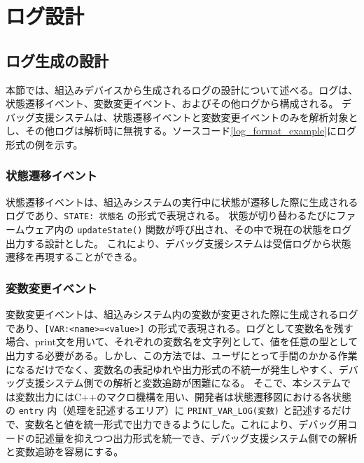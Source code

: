 \documentclass[12pt]{jreport}
\begin{document}
\section{ログ設計}
\label{sec:log_design}

\subsection{ログ生成の設計}
\begin{par}
本節では、組込みデバイスから生成されるログの設計について述べる。ログは、状態遷移イベント、変数変更イベント、およびその他ログから構成される。
デバッグ支援システムは、状態遷移イベントと変数変更イベントのみを解析対象とし、その他ログは解析時に無視する。ソースコード\ref{log_format_example}にログ形式の例を示す。
\end{par}

\subsubsection{状態遷移イベント}
\begin{par}
状態遷移イベントは、組込みシステムの実行中に状態が遷移した際に生成されるログであり、\verb|STATE: 状態名| の形式で表現される。
状態が切り替わるたびにファームウェア内の \verb|updateState()| 関数が呼び出され、その中で現在の状態をログ出力する設計とした。
これにより、デバッグ支援システムは受信ログから状態遷移を再現することができる。
\end{par}

\subsubsection{変数変更イベント}
\begin{par}
変数変更イベントは、組込みシステム内の変数が変更された際に生成されるログであり、\verb|[VAR:<name>=<value>]| の形式で表現される。ログとして変数名を残す場合、print文を用いて、それぞれの変数名を文字列として、値を任意の型として出力する必要がある。しかし、この方法では、ユーザにとって手間のかかる作業になるだけでなく、変数名の表記ゆれや出力形式の不統一が発生しやすく、デバッグ支援システム側での解析と変数追跡が困難になる。
そこで、本システムでは変数出力にはC++のマクロ機構を用い、開発者は状態遷移図における各状態の \texttt{entry} 内（処理を記述するエリア）に
\verb|PRINT_VAR_LOG(変数)| と記述するだけで、変数名と値を統一形式で出力できるようにした。これにより、デバッグ用コードの記述量を抑えつつ出力形式を統一でき、デバッグ支援システム側での解析と変数追跡を容易にする。
\end{par}
\end{document}
